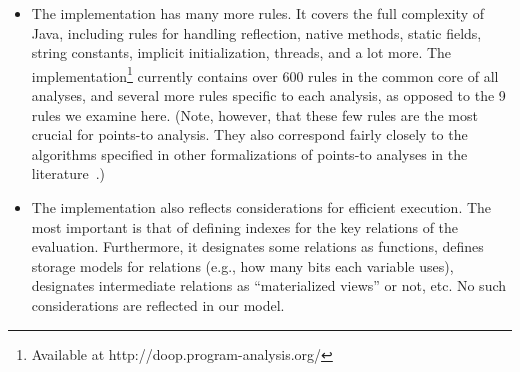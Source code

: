 \begin{itemize}
\item The implementation has many more rules. It covers the full
  complexity of Java, including rules for handling reflection, native
  methods, static fields, string constants, implicit initialization,
  threads, and a lot more. The \doop{}
  implementation\footnote{Available at
    http://doop.program-analysis.org/} currently contains over 600
  rules in the common core of all analyses, and several more rules
  specific to each analysis, as opposed to the 9 rules we examine
  here. (Note, however, that these few rules are the most crucial for
  points-to analysis. They also correspond fairly closely to the
  algorithms specified in other formalizations of points-to analyses
  in the literature~\cite{kcfa-pldi10,pointsto-popl11}.)

\item The implementation also reflects considerations for efficient
  execution. The most important is that of defining indexes for the
  key relations of the evaluation. Furthermore, it designates some
  relations as functions, defines storage models for relations (e.g.,
  how many bits each variable uses), designates intermediate relations
  as ``materialized views'' or not, etc. No such considerations are
  reflected in our model.
\end{itemize}

